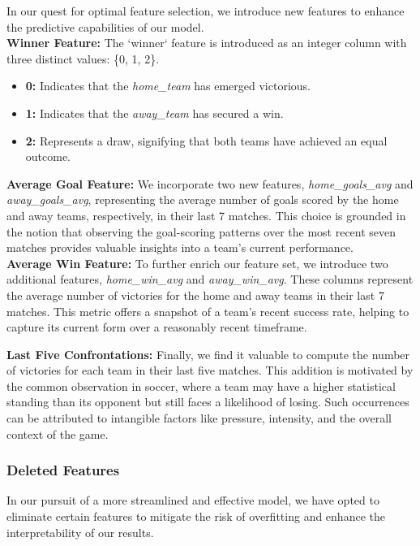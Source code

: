\documentclass[a4paper,12pt]{article}
\begin{document}
In our quest for optimal feature selection, we introduce new features to enhance the predictive capabilities of our model.\\

\textbf{Winner Feature:}
The `winner` feature is introduced as an integer column with three distinct values: \{0, 1, 2\}.
\begin{itemize}
    \item \textbf{0:} Indicates that the {\it home\_team} has emerged victorious.
    \item \textbf{1:} Indicates that the {\it away\_team} has secured a win.
    \item \textbf{2:} Represents a draw, signifying that both teams have achieved an equal outcome.\\
\end{itemize}

\textbf{Average Goal Feature:}
We incorporate two new features, {\it home\_goals\_avg} and {\it away\_goals\_avg}, representing the average number of goals scored by the home and away teams, respectively, in their last 7 matches. This choice is grounded in the notion that observing the goal-scoring patterns over the most recent seven matches provides valuable insights into a team's current performance.\\

\textbf{Average Win Feature:}
To further enrich our feature set, we introduce two additional features, {\it home\_win\_avg} and {\it away\_win\_avg}. These columns represent the average number of victories for the home and away teams in their last 7 matches. This metric offers a snapshot of a team's recent success rate, helping to capture its current form over a reasonably recent timeframe.

\textbf{Last Five Confrontations:}
Finally, we find it valuable to compute the number of victories for each team in their last five matches. This addition is motivated by the common observation in soccer, where a team may have a higher statistical standing than its opponent but still faces a likelihood of losing. Such occurrences can be attributed to intangible factors like pressure, intensity, and the overall context of the game.


\subsubsection{Deleted Features}

In our pursuit of a more streamlined and effective model, we have opted to eliminate certain features to mitigate the risk of overfitting and enhance the interpretability of our results.\\
\end{document}
